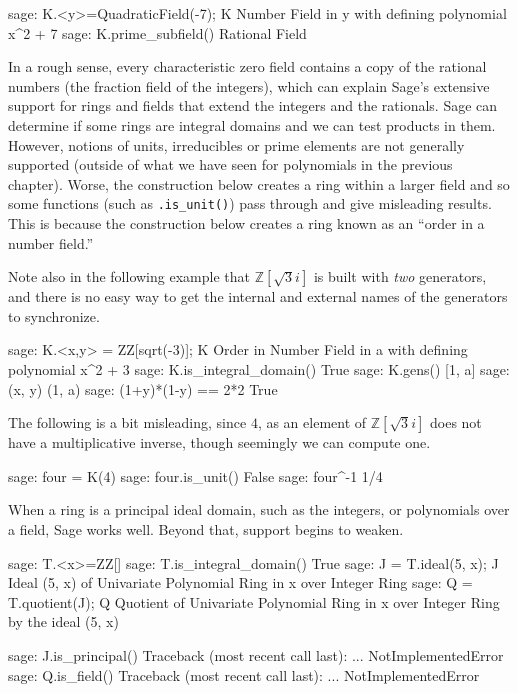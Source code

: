 %
\begin{sageexample}
sage: K.<y>=QuadraticField(-7); K
Number Field in y with defining polynomial x^2 + 7
sage: K.prime_subfield()
Rational Field
\end{sageexample}
%
In a rough sense, every characteristic zero field contains a copy of the rational numbers (the fraction field of the integers), which can explain Sage's extensive support for rings and fields that extend the integers and the rationals.
%
%
Sage can determine if some rings are integral domains and we can test products in them.  However, notions of units, irreducibles or prime elements are not generally supported (outside of what we have seen for polynomials in the previous chapter).  Worse, the construction below creates a ring within a larger field and so some functions (such as \verb?.is_unit()?) pass through and give misleading results.  This is because the construction below creates a ring known as an ``order in a number field.''\par
%
Note also in the following example that ${\mathbb Z}[\sqrt{3}i]$ is built with \emph{two} generators, and there is no easy way to get the internal and external names of the generators to synchronize.
%
\begin{sageexample}
sage: K.<x,y> = ZZ[sqrt(-3)]; K
Order in Number Field in a with defining polynomial x^2 + 3
sage: K.is_integral_domain()
True
sage: K.gens()
[1, a]
sage: (x, y)
(1, a)
sage: (1+y)*(1-y) == 2*2
True
\end{sageexample}
%
The following is a bit misleading, since $4$, as an element of ${\mathbb Z}[\sqrt{3}i]$ does not have a multiplicative inverse, though seemingly we can compute one.
%
\begin{sageexample}
sage: four = K(4)
sage: four.is_unit()
False
sage: four^-1
1/4
\end{sageexample}
%
%
When a ring is a principal ideal domain, such as the integers, or polynomials over a field, Sage works well.  Beyond that, support begins to weaken.
%
\begin{sageexample}
sage: T.<x>=ZZ[]
sage: T.is_integral_domain()
True
sage: J = T.ideal(5, x); J
Ideal (5, x) of Univariate Polynomial Ring in x over Integer Ring
sage: Q = T.quotient(J); Q
Quotient of Univariate Polynomial Ring in x over
Integer Ring by the ideal (5, x)
\end{sageexample}
%
\begin{sageexample}
sage: J.is_principal()
Traceback (most recent call last):
...
NotImplementedError
sage: Q.is_field()
Traceback (most recent call last):
...
NotImplementedError
\end{sageexample}
%







